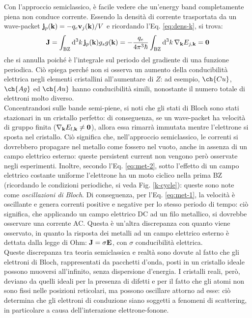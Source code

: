 Con l'approccio semiclassico, è facile vedere che un'energy band completamente piena non conduce corrente. Essendo la densità di corrente trasportata da un wave-packet $ \mathbf{j}_p(\mathbf{k}) = -q_e \mathbf{v}_j(\mathbf{k}) / V $ e ricordando l'Eq. \ref{eq:dens-k}, si trova:
\begin{equation*}
	\mathbf{J} = \int_\text{BZ} \mathrm{d}^3k\, \mathbf{j}_p(\mathbf{k}) g_s g(\mathbf{k}) = - \frac{q_e}{4\pi^3 \hbar} \int_\text{BZ} \mathrm{d}^3k\, \nabla_{\mathbf{k}} E_{j,\mathbf{k}} = \mathbf{0}
\end{equation*}
che si annulla poiché è l'integrale sul periodo del gradiente di una funzione periodica. Ciò spiega perché non si osserva un aumento della conducibilità elettrica negli elementi cristallini all'aumentare di $ Z $: ad esempio, $ \ch{Cu} $, $ \ch{Ag} $ ed $ \ch{Au} $ hanno conducibilità simili, nonostante il numero totale di elettroni molto diverso. \\
Concentrandosi sulle bande semi-piene, si noti che gli stati di Bloch sono stati stazionari in un cristallo perfetto: di conseguenza, se un wave-packet ha velocità di gruppo finita ($ \nabla_{\mathbf{k}} E_{l,\mathbf{k}} \neq \mathbf{0} $), allora essa rimarrà immutata mentre l'elettrone si sposta nel cristallo. Ciò significa che, nell'approccio semiclassico, le correnti si dovrebbero propagare nel metallo come fossero nel vuoto, anche in assenza di un campo elettrico esterno: queste persistent current non vengono però osservate negli esperimenti.
Inoltre, secondo l'Eq. \ref{eq:met-2}, sotto l'effetto di un campo elettrico costante uniforme l'elettrone ha un moto ciclico nella prima BZ (ricordando le condizioni periodiche, si veda Fig. \ref{k-cycle}): queste sono note come \textit{oscillazioni di Bloch}. Di conseguenza, per l'Eq. \ref{eq:met-1}, la velocità è oscillante e genera correnti positive e negative per lo stesso periodo di tempo: ciò significa, che applicando un campo elettrico DC ad un filo metallico, si dovrebbe osservare una corrente AC. Questa è un'altra discrepanza con quanto viene osservato, in quanto la risposta dei metalli ad un campo elettrico esterno è dettata dalla legge di Ohm: $ \mathbf{J} = \sigma \mathbf{E} $, con $ \sigma $ conducibilità elettrica. \\
Queste discrepanza tra teoria semiclassica e realtà sono dovute al fatto che gli elettroni di Bloch, rappresentati da pacchetti d'onda, posti in un cristallo ideale possono muoversi all'infinito, senza dispersione d'energia. I cristalli reali, però, deviano da quelli ideali per la presenza di difetti e per il fatto che gli atomi non sono fissi nelle posizioni reticolari, ma possono oscillare attorno ad esse: ciò determina che gli elettroni di conduzione siano soggetti a fenomeni di scattering, in particolare a causa dell'interazione elettrone-fonone.

